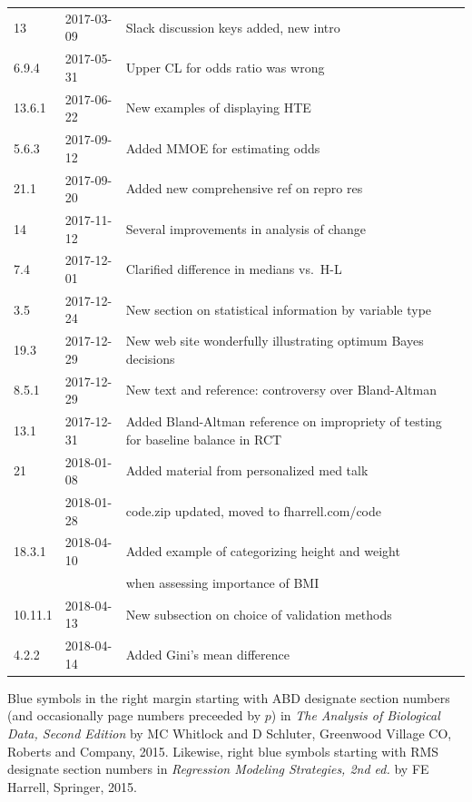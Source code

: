 \documentclass{report}
\begin{document}
\begin{center}
\begin{tabular}{lll}
13      & 2017-03-09 & Slack discussion keys added, new intro \\
6.9.4   & 2017-05-31 & Upper CL for odds ratio was wrong \\
13.6.1  & 2017-06-22 & New examples of displaying HTE \\
5.6.3   & 2017-09-12 & Added MMOE for estimating odds \\
21.1    & 2017-09-20 & Added new comprehensive ref on repro res \\
14      & 2017-11-12 & Several improvements in analysis of change\\
7.4     & 2017-12-01 & Clarified difference in medians vs.\ H-L\\
3.5     & 2017-12-24 & New section on statistical information by
                       variable type\\
19.3    & 2017-12-29 & New web site wonderfully illustrating optimum
                       Bayes decisions\\
8.5.1   & 2017-12-29 & New text and reference: controversy over
                       Bland-Altman\\
13.1    & 2017-12-31 & Added Bland-Altman reference on impropriety of
                       testing for baseline balance in RCT\\
21      & 2018-01-08 & Added material from personalized med talk\\
        & 2018-01-28 & code.zip updated, moved to fharrell.com/code\\
18.3.1  & 2018-04-10 & Added example of categorizing height and weight\\
        &            & when assessing importance of BMI\\
10.11.1 & 2018-04-13 & New subsection on choice of validation methods\\
4.2.2   & 2018-04-14 & Added Gini's mean difference\\
\hline
\end{tabular}\end{center}
\else
\fi

Blue symbols in the right margin starting with ABD designate
section numbers (and occasionally page numbers preceeded by $p$)
in \emph{The Analysis of Biological Data, Second Edition} by MC Whitlock and D
Schluter, Greenwood Village CO, Roberts and Company, 2015.  Likewise, right
blue symbols starting with RMS designate section numbers in \emph{Regression
Modeling Strategies, 2nd ed.} by FE Harrell, Springer, 2015.
\end{document}
